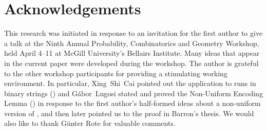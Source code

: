 \documentclass[prodmode,acmcsur]{acmsmall}
\begin{document}
\section*{Acknowledgements}

This research was initiated in response to an invitation for the first
author to give a talk at the Ninth Annual Probability, Combinatorics
and Geometry Workshop, held April 4--11 at McGill University's
Bellairs Institute.  Many ideas that appear in the current paper were
developed during the workshop. The author is grateful to the other
workshop participants for providing a stimulating working environment.
In particular, Xing~Shi~Cai pointed out the application to runs in
binary strings () and G\'abor~Lugosi stated and proved
the Non-Uniform Encoding Lemma () in response to the first
author's half-formed ideas about a non-uniform version of ,
and then later pointed us to the proof in Barron's thesis.  We would
also like to thank G\"unter Rote for valuable comments.

{}

\end{document}
